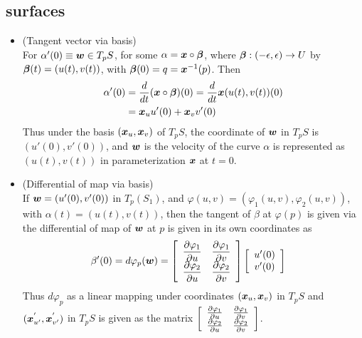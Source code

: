 \documentclass[11pt]{article}
\begin{document}
\subsection{surfaces}
\begin{itemize}
\item (Tangent vector via basis)\\
 For $\alpha'(0)\equiv \boldsymbol{w} \in T_{p}S$, for some $\alpha = \boldsymbol{x}\circ \boldsymbol{\beta}$, where $\boldsymbol{\beta}: (-\epsilon, \epsilon) \rightarrow U$ by $\boldsymbol{\beta}(t) = (u(t), v(t))$, with $\boldsymbol{\beta}(0) = q = \boldsymbol{x}^{-1}(p)$. Then 
\begin{align}
\alpha'(0)&= \frac{d}{dt}(\boldsymbol{x}\circ\boldsymbol{\beta})(0) = \frac{d}{dt}\boldsymbol{x}(u(t), v(t))(0)\\
&=\boldsymbol{x}_{u}u'(0) + \boldsymbol{x}_{v}v'(0) \label{eqn: tangent_line_coord}
\end{align} 
Thus under the basis $(\boldsymbol{x}_{u}, \boldsymbol{x}_{v})$ of $T_{p}S$, the coordinate of $\boldsymbol{w}$ in $T_{p}S$ is $(u'(0), v'(0))$, and $\boldsymbol{w}$ is the velocity of  the curve $\alpha$ is represented as $(u(t), v(t))$ in parameterization $\boldsymbol{x}$ at $t=0$. 

\item (Differential of map via basis)\\
 If $\boldsymbol{w} = (u'(0), v'(0))$ in $T_{p}(S_{1})$,  and $\varphi(u,v) = (\varphi_{1}(u,v), \varphi_{2}(u,v))$, with $\alpha(t) = (u(t), v(t))$, then the tangent of $\beta$ at $\varphi(p)$ is given via the differential of map of $\boldsymbol{w}$ at $p$ is given in its own coordinates as 
\begin{align}
 \beta'(0)= d\varphi_{p}(\boldsymbol{w}) &= \left[\begin{array}{cc}
 \dfrac{\partial \varphi_{1}}{ \partial u} & \dfrac{\partial \varphi_{1}}{ \partial v} \\ 
 \dfrac{\partial \varphi_{2}}{ \partial u} & \dfrac{\partial \varphi_{2}}{ \partial v}
 \end{array} \right] \left[\begin{array}{c}
 u'(0) \\ 
 v'(0)
 \end{array} \right] \label{eqn: diff_map_coord}
\end{align}
Thus $d\varphi_{p}$ as a linear mapping under coordinates $(\boldsymbol{x}_{u}, \boldsymbol{x}_{v})$ in $T_{p}S$ and $(\boldsymbol{x}^{'}_{u'}, \boldsymbol{x}^{'}_{v'})$ in $T_{p}S$ is given as the matrix $\left[\begin{array}{cc}
 \frac{\partial \varphi_{1}}{ \partial u} & \frac{\partial \varphi_{1}}{ \partial v} \\ 
 \frac{\partial \varphi_{2}}{ \partial u} & \frac{\partial \varphi_{2}}{ \partial v}
 \end{array} \right] $.
 

\end{itemize}
\end{document}
